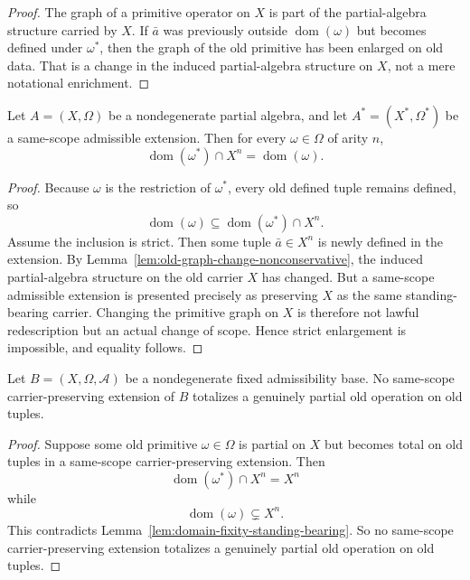 \begin{proof}
The graph of a primitive operator on $X$ is part of the partial-algebra structure carried by $X$. If $\bar a$ was previously outside $\operatorname{dom}(\omega)$ but becomes defined under $\omega^{\ast}$, then the graph of the old primitive has been enlarged on old data. That is a change in the induced partial-algebra structure on $X$, not a mere notational enrichment.
\end{proof}

\begin{lemma}
\label{lem:domain-fixity-standing-bearing}
Let $A=(X,\Omega)$ be a nondegenerate partial algebra, and let $A^{\ast}=(X^{\ast},\Omega^{\ast})$ be a same-scope admissible extension. Then for every $\omega\in\Omega$ of arity $n$,
\[
\operatorname{dom}(\omega^{\ast})\cap X^n=\operatorname{dom}(\omega).
\]
\end{lemma}

\begin{proof}
Because $\omega$ is the restriction of $\omega^{\ast}$, every old defined tuple remains defined, so
\[
\operatorname{dom}(\omega)\subseteq \operatorname{dom}(\omega^{\ast})\cap X^n.
\]
Assume the inclusion is strict. Then some tuple $\bar a\in X^n$ is newly defined in the extension. By Lemma~\ref{lem:old-graph-change-nonconservative}, the induced partial-algebra structure on the old carrier $X$ has changed. But a same-scope admissible extension is presented precisely as preserving $X$ as the same standing-bearing carrier. Changing the primitive graph on $X$ is therefore not lawful redescription but an actual change of scope. Hence strict enlargement is impossible, and equality follows.
\end{proof}

\begin{theorem}
\label{thm:no-internal-totalization}
Let $B=(X,\Omega,\mathcal A)$ be a nondegenerate fixed admissibility base. No same-scope carrier-preserving extension of $B$ totalizes a genuinely partial old operation on old tuples.
\end{theorem}

\begin{proof}
Suppose some old primitive $\omega\in\Omega$ is partial on $X$ but becomes total on old tuples in a same-scope carrier-preserving extension. Then
\[
\operatorname{dom}(\omega^{\ast})\cap X^n=X^n
\]
while
\[
\operatorname{dom}(\omega)\subsetneq X^n.
\]
This contradicts Lemma~\ref{lem:domain-fixity-standing-bearing}. So no same-scope carrier-preserving extension totalizes a genuinely partial old operation on old tuples.
\end{proof}

